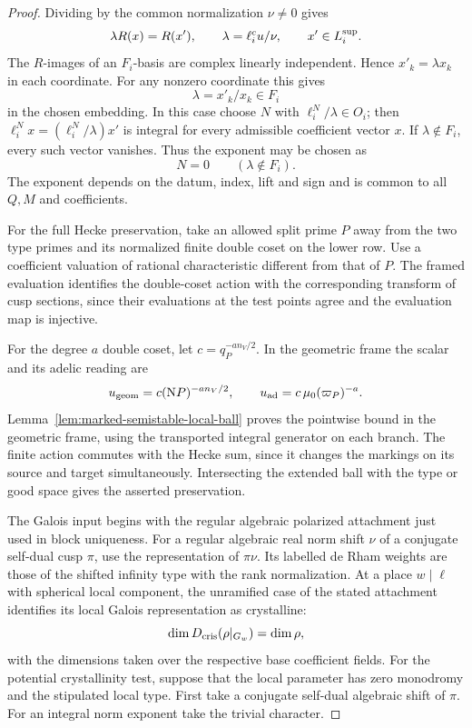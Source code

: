 \begin{proof}
Dividing by the common normalization \(\nu\ne0\) gives
\[
 \lambda R(x)=R(x'),\qquad \lambda=\ell_i^c u/\nu,\qquad
 x'\in L_{i}^{\rm sup}.
\]
The \(R\)-images of an \(F_i\)-basis are complex linearly
independent. Hence \(x'_k=\lambda x_k\) in each coordinate.
For any nonzero coordinate this gives
\[
                 \lambda=x'_k/x_k\in F_i
\]
in the chosen embedding. In this case choose \(N\) with
\(\ell_i^N/\lambda\in O_i\); then \(\ell_i^Nx=(\ell_i^N/\lambda)x'\)
is integral for every admissible coefficient vector \(x\). If \(\lambda\notin F_i\), every such vector vanishes. Thus the exponent may be chosen as
\[
 N=0\qquad(\lambda\notin F_i).
\] The exponent depends
on the datum, index, lift and sign and is common to all \(Q,M\)
and coefficients. \label{cor:automorphic-realization-48}

For the full Hecke preservation, take an allowed split prime \(P\)
away from the two type primes and its normalized finite double coset
on the lower row. Use a coefficient valuation of rational
characteristic different from that of \(P\). The framed evaluation
identifies the double-coset action with the corresponding transform
of cusp sections, since their evaluations at the test points agree and
the evaluation map is injective.

For the degree \(a\) double coset, let \(c=q_P^{-a n_V/2}\).
In the geometric frame the scalar and its adelic reading are
\[
  u_{\rm geom}=c(\mathrm NP)^{-a n_V/2},\qquad
  u_{\rm ad}=c\,\mu_0(\varpi_P)^{-a}.
\]
Lemma~\ref{lem:marked-semistable-local-ball} proves the pointwise bound in the geometric frame, using the transported integral generator on each branch. The finite action commutes with the Hecke sum, since it changes the markings on its source and target simultaneously. Intersecting the extended ball with the type or good space gives the asserted preservation.

\label{cor:automorphic-realization-49}

The Galois input begins with the regular algebraic polarized
attachment just used in block uniqueness. For a regular
algebraic real norm shift \(\nu\) of a conjugate self-dual
cusp \(\pi\), use the representation of \(\pi\nu\).
Its labelled de Rham weights are those of the shifted infinity
type with the rank normalization. At a place \(w\mid\ell\) with spherical local component, the unramified case of the stated attachment identifies its local Galois representation as crystalline:
\[
 \dim D_{\rm cris}(\rho|_{G_w})=\dim\rho ,
\]
with the dimensions taken over the respective base coefficient fields. For the potential crystallinity
test, suppose that the local parameter has zero monodromy
and the stipulated local type. First take a conjugate
self-dual algebraic shift of \(\pi\). For an integral norm
exponent take the trivial character.


\end{proof}
